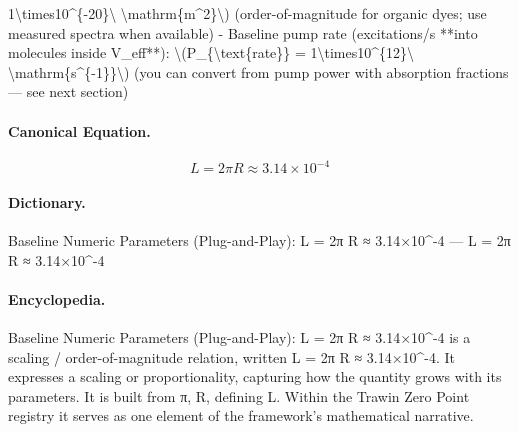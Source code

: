 1\textbackslash{}times10\textasciicircum{}\{-20\}\textbackslash{} \textbackslash{}mathrm\{m\textasciicircum{}2\}\textbackslash{}) (order-of-magnitude for organic dyes; use measured spectra when available) - Baseline pump rate (excitations/s **into molecules inside V\_eff**): \textbackslash{}(P\_\{\textbackslash{}text\{rate\}\} = 1\textbackslash{}times10\textasciicircum{}\{12\}\textbackslash{} \textbackslash{}mathrm\{s\textasciicircum{}\{-1\}\}\textbackslash{}) (you can convert from pump power with absorption fractions — see next section)

\paragraph{Canonical Equation.}
\[
L = 2\pi R \approx 3.14\times10^{-4}
\]

\paragraph{Dictionary.}
Baseline Numeric Parameters (Plug-and-Play): L = 2π R ≈ 3.14×10\textasciicircum{}-4 — L = 2π R ≈ 3.14×10\textasciicircum{}-4

\paragraph{Encyclopedia.}
Baseline Numeric Parameters (Plug-and-Play): L = 2π R ≈ 3.14×10\textasciicircum{}-4 is a scaling / order-of-magnitude relation, written L = 2π R ≈ 3.14×10\textasciicircum{}-4. It expresses a scaling or proportionality, capturing how the quantity grows with its parameters. It is built from π, R, defining L. Within the Trawin Zero Point registry it serves as one element of the framework's mathematical narrative.
